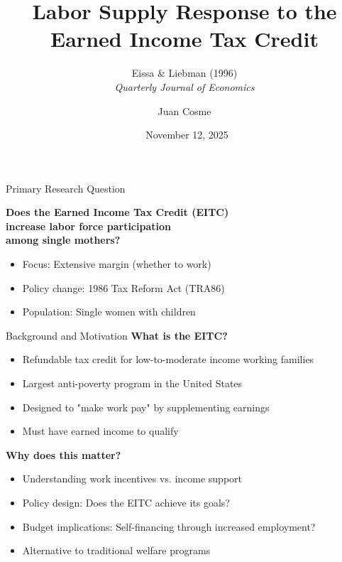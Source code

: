 \documentclass[aspectratio=169]{beamer}
\title[EITC and Labor Supply]{Labor Supply Response to the Earned Income Tax Credit}
\subtitle{Eissa \& Liebman (1996) \\ \textit{Quarterly Journal of Economics}}
\author{Juan Cosme}
\institute{University of South Florida}
\date{\ November 12, 2025}
\begin{document}
\begin{frame}
\titlepage
\end{frame}

\begin{frame}{Primary Research Question}
\vspace{1cm}
\begin{center}
\LARGE
\textbf{Does the Earned Income Tax Credit (EITC) \\increase labor force participation \\among single mothers?}
\end{center}

\vspace{1cm}
\begin{itemize}
    \item Focus: Extensive margin (whether to work)
    \item Policy change: 1986 Tax Reform Act (TRA86)
    \item Population: Single women with children
\end{itemize}
\end{frame}

\begin{frame}{Background and Motivation}
\textbf{What is the EITC?}
\begin{itemize}
    \item Refundable tax credit for low-to-moderate income working families
    \item Largest anti-poverty program in the United States
    \item Designed to "make work pay" by supplementing earnings
    \item Must have earned income to qualify
\end{itemize}

\vspace{0.5cm}
\textbf{Why does this matter?}
\begin{itemize}
    \item Understanding work incentives vs. income support
    \item Policy design: Does the EITC achieve its goals?
    \item Budget implications: Self-financing through increased employment?
    \item Alternative to traditional welfare programs
\end{itemize}
\end{frame}
\end{document}
